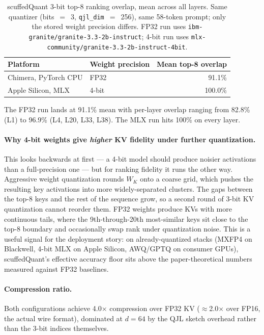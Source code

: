 \documentclass[11pt]{article}
\begin{document}
\begin{table}[h]
\centering
\caption{scuffedQuant 3-bit top-8 ranking overlap, mean across all layers. Same quantizer (bits~$=$~3, \texttt{qjl\_dim}~$=$~256), same 58-token prompt; only the stored weight precision differs. FP32 run uses \texttt{ibm-granite/granite-3.3-2b-instruct}; 4-bit run uses \texttt{mlx-community/granite-3.3-2b-instruct-4bit}.}
\label{tab:scuffedquant_mlx}
\begin{tabular}{llr}
\toprule
Platform & Weight precision & Mean top-8 overlap \\
\midrule
Chimera, PyTorch CPU & FP32 & 91.1\% \\
Apple Silicon, MLX   & 4-bit & 100.0\% \\
\bottomrule
\end{tabular}
\end{table}

The FP32 run lands at 91.1\% mean with per-layer overlap ranging from 82.8\% (L1) to 96.9\% (L4, L20, L33, L38). The MLX run hits 100\% on every layer.

\paragraph{Why 4-bit weights give \emph{higher} KV fidelity under further quantization.} This looks backwards at first --- a 4-bit model should produce noisier activations than a full-precision one --- but for ranking fidelity it runs the other way. Aggressive weight quantization rounds $W_K$ onto a coarse grid, which pushes the resulting key activations into more widely-separated clusters. The gaps between the top-8 keys and the rest of the sequence grow, so a second round of 3-bit KV quantization cannot reorder them. FP32 weights produce KVs with more continuous tails, where the 9th-through-20th most-similar keys sit close to the top-8 boundary and occasionally swap rank under quantization noise. This is a useful signal for the deployment story: on already-quantized stacks (MXFP4 on Blackwell, 4-bit MLX on Apple Silicon, AWQ/GPTQ on consumer GPUs), scuffedQuant's effective accuracy floor sits above the paper-theoretical numbers measured against FP32 baselines.

\paragraph{Compression ratio.} Both configurations achieve 4.0$\times$ compression over FP32 KV ($\approx$2.0$\times$ over FP16, the actual wire format), dominated at $d=64$ by the QJL sketch overhead rather than the 3-bit indices themselves.
\end{document}
